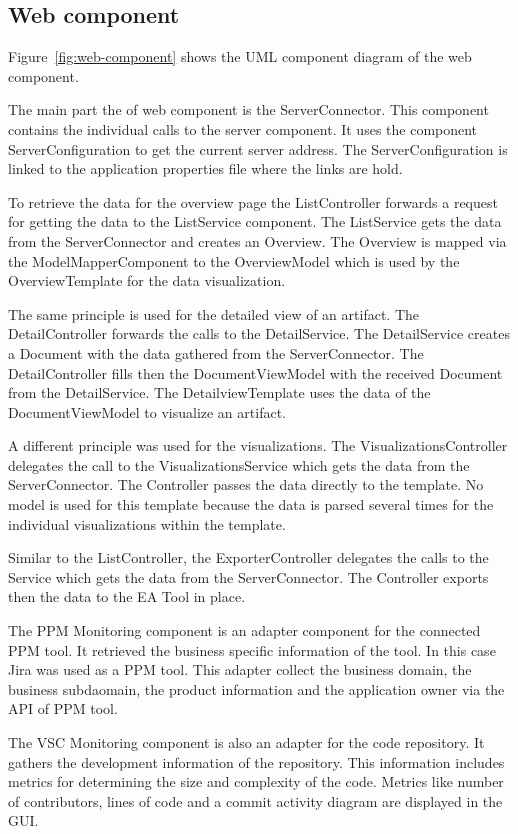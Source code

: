 \subsection{Web component}

Figure~\ref{fig:web-component} shows the UML component diagram of the web component. 

The main part the of web component is the ServerConnector. This component contains the individual calls to the server component. It uses the component ServerConfiguration to get the current server address. The ServerConfiguration is linked to the application properties file where the links are hold.

To retrieve the data for the overview page the ListController forwards a request for getting the data to the ListService component. The ListService gets the data from the ServerConnector and creates an Overview. The Overview is mapped via the ModelMapperComponent to the OverviewModel which is used by the OverviewTemplate for the data visualization.

The same principle is used for the detailed view of an artifact. The DetailController forwards the calls to the DetailService. The DetailService creates a Document with the data gathered from the ServerConnector. The DetailController fills then the DocumentViewModel with the received Document from the DetailService. The DetailviewTemplate uses the data of the DocumentViewModel to visualize an artifact.

A different principle was used for the visualizations. The VisualizationsController delegates the call to the VisualizationsService which gets the data from the ServerConnector. The Controller passes the data directly to the template. No model is used for this template because the data is parsed several times for the individual visualizations within the template.

Similar to the ListController, the ExporterController delegates the calls to the Service which gets the data from the ServerConnector. The Controller exports then the data to the EA Tool in place.

The PPM Monitoring component is an adapter component for the connected PPM tool. It retrieved the business specific information of the tool. In this case Jira was used as a PPM tool. This adapter collect the business domain, the business subdaomain, the product information and the application owner via the API of PPM tool.

The VSC Monitoring component is also an adapter for the code repository. It gathers the development information of the repository. This information includes metrics for determining the size and complexity of the code. Metrics like number of contributors, lines of code and a commit activity diagram are displayed in the GUI.

